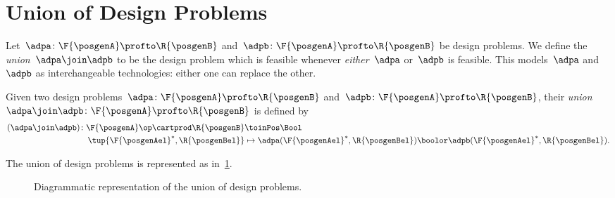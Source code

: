 
\section{Union of Design Problems}


Let~$\adpa\colon \F{\posgenA}\profto \R{\posgenB}$ and~$\adpb\colon \F{\posgenA}\profto \R{\posgenB}$ be design problems.
We define the \emph{union}~$\adpa \join \adpb$ to be the design problem which is feasible whenever \emph{either}~$\adpa$ or~$\adpb$ is feasible.
This models~$\adpa$ and~$\adpb$ as interchangeable technologies: either one can replace the other.

\begin{definition}
    \label{def:union_dp}
    Given two design problems~$\adpa \colon \F{\posgenA} \profto \R{\posgenB}$ and~$\adpb\colon \F{\posgenA} \profto \R{\posgenB}$, their \emph{union}~$\adpa \join \adpb\colon \F{\posgenA} \profto \R{\posgenB}$ is defined by
    \begin{equation}
        \begin{aligned}
            (\adpa \join \adpb)
            \colon \F{\posgenA}\op \cartprod \R{\posgenB} & \toinPos \Bool                                                                                   \\
            \tup{\F{\posgenAel}^*, \R{\posgenBel}}        & \mapsto \adpa(\F{\posgenAel}^*, \R{\posgenBel}) \boolor \adpb(\F{\posgenAel}^*, \R{\posgenBel}). 
        \end{aligned}
    \end{equation}
\end{definition}

The union of design problems is represented as in~\cref{fig:uniondp}.

\begin{figure}[h!]
    \centering
    \caption{Diagrammatic representation of the union of design problems. }
    \label{fig:uniondp}
\end{figure}

